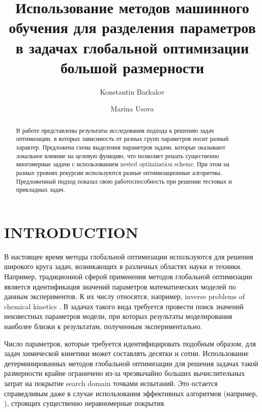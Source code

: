 \documentclass{aip-cp}
\begin{document}
\title{Использование методов машинного обучения для разделения параметров в задачах глобальной оптимизации большой размерности}

\author[aff1]{Konstantin Barkalov}
\author[aff1]{Marina Usova}


\maketitle

\begin{abstract}
В работе представлены результаты исследования подхода к решению задач оптимизации, в которых зависимость от разных групп параметров носит разный характер.
Предложена схема выделения параметров задачи, которые оказывают локальное влияние на целевую функцию, что позволяет решать существенно многомерные задачи с использованием nested optimization scheme. При этом на разных уровнях рекурсии используются разные оптимизационные алгоритмы. Предложенный подход показал свою работоспособность при решении тестовых и прикладных задач.

\end{abstract}

\section{INTRODUCTION}

В настоящее время методы глобальной оптимизации используются для решения широкого круга задач, возникающих в различных областях науки и техники. 
Например, традиционной сферой применения методов глобальной оптимизации является идентификация значений параметров математических моделей по данным экспериментов. К их числу относятся, например, inverse problems of chemical kinetics \cite{Gubaydullin2021}.  В задачах такого вида требуется провести поиск значений неизвестных параметров модели, при которых результаты моделирования наиболее близки к результатам, полученным экспериментально.

Число параметров, которые требуется идентифицировать подобным образом, для задач химической кинетики может составлять десятки и сотни. Использование детерминированных методов глобальной оптимизации для решения задачах такой размерности крайне ограничено из-за чрезвычайно больших вычислительных затрат на покрытие search domain точками испытаний. Это остается справедливым даже в случае использования эффективных алгоритмов (например, \cite{Paulavicius2011,Evtushenko2009,Jones2009}), строящих существенно неравномерные покрытия. 
\end{document}
